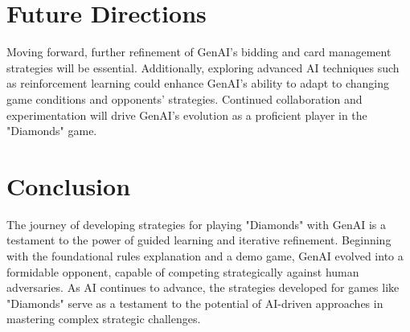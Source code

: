 \documentclass{article}
\begin{document}
\section{Future Directions}
Moving forward, further refinement of GenAI's bidding and card management strategies will be essential. Additionally, exploring advanced AI techniques such as reinforcement learning could enhance GenAI's ability to adapt to changing game conditions and opponents' strategies. Continued collaboration and experimentation will drive GenAI's evolution as a proficient player in the "Diamonds" game.

\section{Conclusion}
The journey of developing strategies for playing "Diamonds" with GenAI is a testament to the power of guided learning and iterative refinement. Beginning with the foundational rules explanation and a demo game, GenAI evolved into a formidable opponent, capable of competing strategically against human adversaries. As AI continues to advance, the strategies developed for games like "Diamonds" serve as a testament to the potential of AI-driven approaches in mastering complex strategic challenges.
\end{document}

